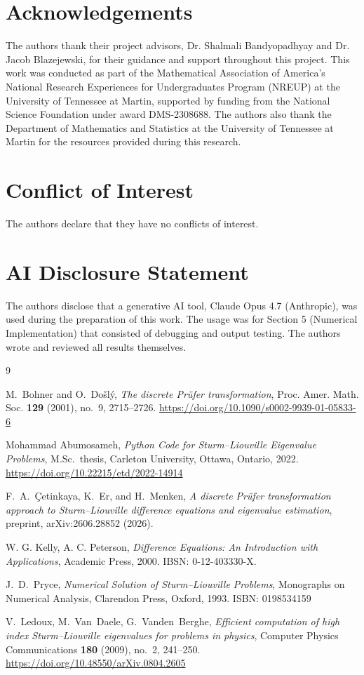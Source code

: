 \documentclass[12pt,reqno]{amsart}
\numberwithin{equation}{section}
\begin{document}
\section*{Acknowledgements}
The authors thank their project advisors, Dr. Shalmali Bandyopadhyay and Dr. Jacob Blazejewski, for their guidance and support throughout this project. This work was conducted as part of the Mathematical Association of America's National Research Experiences for Undergraduates Program (NREUP) at the University of Tennessee at Martin, supported by funding from the National Science Foundation under award DMS-2308688. The authors also thank the Department of Mathematics and Statistics at the University of Tennessee at Martin for the resources provided during this research.



\section*{Conflict of Interest}
\noindent The authors declare that they have no conflicts of interest.

\section*{AI Disclosure Statement}
\noindent The authors disclose that a generative AI tool, Claude Opus 4.7 (Anthropic), was used during the preparation of this work. The usage was for Section 5 (Numerical Implementation) that consisted of debugging and output testing. The authors wrote and reviewed all results themselves. 

\begin{thebibliography}{9}

M.~Bohner and O.~Do\v{s}l\'y,
\textit{The discrete Pr\"ufer transformation},
Proc. Amer. Math. Soc. \textbf{129} (2001), no.~9, 2715--2726.
\url{https://doi.org/10.1090/s0002-9939-01-05833-6}


Mohammad Abumosameh,
\emph{Python Code for Sturm--Liouville Eigenvalue Problems},
M.Sc.\ thesis, Carleton University, Ottawa, Ontario, 2022.
\url{https://doi.org/10.22215/etd/2022-14914}

F.~A.~\c{C}etinkaya, K.~Er, and H.~Menken,
\textit{A discrete Pr\"ufer transformation approach to Sturm--Liouville difference equations and eigenvalue estimation},
preprint, arXiv:2606.28852 (2026).

 W. G. Kelly, A. C. Peterson, \emph{Difference Equations: An Introduction with Applications}, Academic Press, 2000.
IBSN: {0-12-403330-X}.

 J.~D.~Pryce, \emph{Numerical Solution of Sturm--Liouville Problems}, Monographs on Numerical Analysis, Clarendon Press, Oxford, 1993. ISBN: {0198534159}

 V.~Ledoux, M.~Van~Daele, G.~Vanden~Berghe, \emph{Efficient computation of high index Sturm--Liouville eigenvalues for problems in physics}, Computer Physics Communications \textbf{180} (2009), no.~2, 241--250.
\url{https://doi.org/10.48550/arXiv.0804.2605}

\end{thebibliography}
\end{document}

